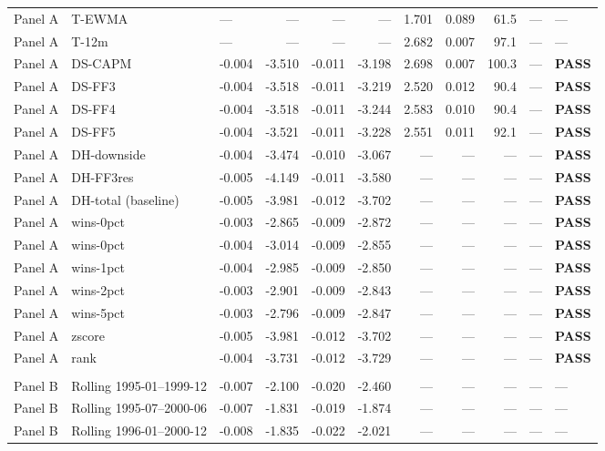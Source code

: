 \begin{longtable}{lllrrrrrrrl}
Panel A & T-EWMA & — & — & — & — & 1.701 & 0.089 & 61.5 & — & — \\
Panel A & T-12m & — & — & — & — & 2.682 & 0.007 & 97.1 & — & — \\
Panel A & DS-CAPM & -0.004 & -3.510 & -0.011 & -3.198 & 2.698 & 0.007 & 100.3 & — & \textbf{PASS} \\
Panel A & DS-FF3 & -0.004 & -3.518 & -0.011 & -3.219 & 2.520 & 0.012 & 90.4 & — & \textbf{PASS} \\
Panel A & DS-FF4 & -0.004 & -3.518 & -0.011 & -3.244 & 2.583 & 0.010 & 90.4 & — & \textbf{PASS} \\
Panel A & DS-FF5 & -0.004 & -3.521 & -0.011 & -3.228 & 2.551 & 0.011 & 92.1 & — & \textbf{PASS} \\
Panel A & DH-downside & -0.004 & -3.474 & -0.010 & -3.067 & — & — & — & — & \textbf{PASS} \\
Panel A & DH-FF3res & -0.005 & -4.149 & -0.011 & -3.580 & — & — & — & — & \textbf{PASS} \\
Panel A & DH-total (baseline) & -0.005 & -3.981 & -0.012 & -3.702 & — & — & — & — & \textbf{PASS} \\
Panel A & wins-0pct & -0.003 & -2.865 & -0.009 & -2.872 & — & — & — & — & \textbf{PASS} \\
Panel A & wins-0pct & -0.004 & -3.014 & -0.009 & -2.855 & — & — & — & — & \textbf{PASS} \\
Panel A & wins-1pct & -0.004 & -2.985 & -0.009 & -2.850 & — & — & — & — & \textbf{PASS} \\
Panel A & wins-2pct & -0.003 & -2.901 & -0.009 & -2.843 & — & — & — & — & \textbf{PASS} \\
Panel A & wins-5pct & -0.003 & -2.796 & -0.009 & -2.847 & — & — & — & — & \textbf{PASS} \\
Panel A & zscore & -0.005 & -3.981 & -0.012 & -3.702 & — & — & — & — & \textbf{PASS} \\
Panel A & rank & -0.004 & -3.731 & -0.012 & -3.729 & — & — & — & — & \textbf{PASS} \\
\addlinespace
\multicolumn{11}{l}{\textit{Panel B: Sample and Time Period Sensitivity}} \\
Panel B & Rolling 1995-01–1999-12 & -0.007 & -2.100 & -0.020 & -2.460 & — & — & — & — & — \\
Panel B & Rolling 1995-07–2000-06 & -0.007 & -1.831 & -0.019 & -1.874 & — & — & — & — & — \\
Panel B & Rolling 1996-01–2000-12 & -0.008 & -1.835 & -0.022 & -2.021 & — & — & — & — & — \\

\end{longtable}
